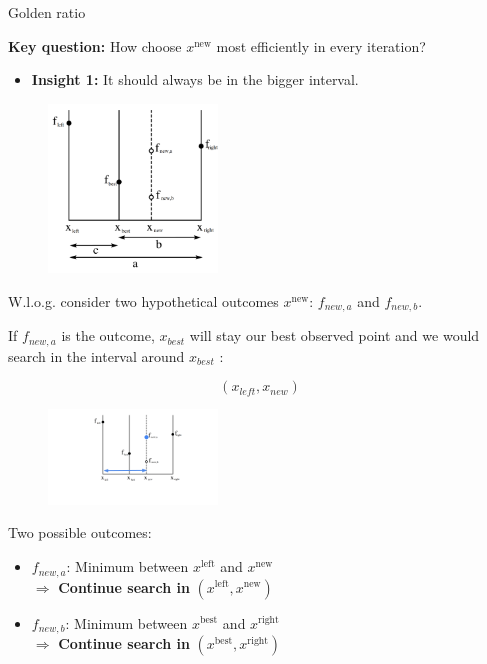 \documentclass[11pt,compress,t,notes=noshow, xcolor=table]{beamer}
\begin{document}
\begin{vbframe}{Golden ratio}

\textbf{Key question:} How choose $x^{\text{new}}$ most efficiently in every iteration? 

\begin{itemize}
    \item \textbf{Insight 1: } It should always be in the bigger interval. 
\end{itemize}

\lz 

\begin{figure}
\includegraphics[width=0.4\textwidth]{figure_man/goldensec.png}\\
\end{figure}

W.l.o.g. consider two hypothetical outcomes $x^{\text{new}}$: $f_{new, a}$ and $f_{new, b}$. 

\framebreak 

If $f_{new, a}$ is the outcome, $x_{best}$ will stay our best observed point and we would search in the interval around $x_{best}$ : 

$$
    (x_{left}, x_{new}) 
$$

\begin{figure}
\includegraphics[width=0.4\textwidth]{figure_man/goldensec-1.png}\\
\end{figure}

\framebreak 

Two possible outcomes: 

\begin{itemize}
  \item $f_{new, a}$: Minimum between $x^{\text{left}}$ and $x^{\text{new}}$ \\
  $\Rightarrow$ \textbf{Continue search in } $(x^{\text{left}}, x^{\text{new}})$
  \item $f_{new, b}$: Minimum between $x^{\text{best}}$ and $x^{\text{right}}$ \\
  $\Rightarrow$ \textbf{Continue search in } $(x^{\text{best}}, x^{\text{right}})$
\end{itemize}


\end{vbframe}
\end{document}
